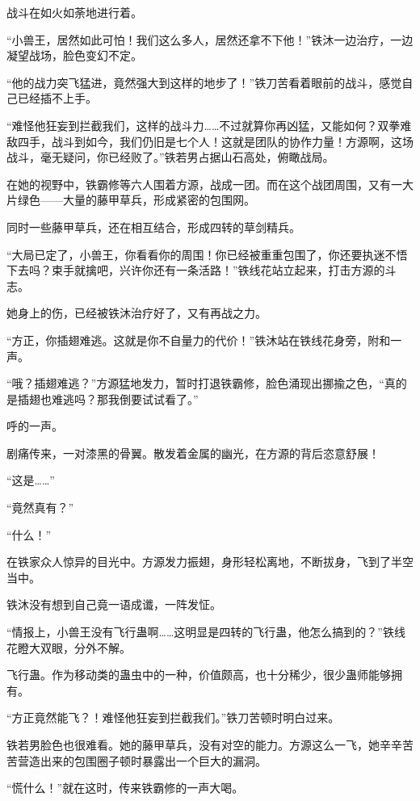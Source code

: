 
\begin{this_body}

战斗在如火如荼地进行着。

“小兽王，居然如此可怕！我们这么多人，居然还拿不下他！”铁沐一边治疗，一边凝望战场，脸色变幻不定。

“他的战力突飞猛进，竟然强大到这样的地步了！”铁刀苦看着眼前的战斗，感觉自己已经插不上手。

“难怪他狂妄到拦截我们，这样的战斗力……不过就算你再凶猛，又能如何？双拳难敌四手，战斗到如今，我们仍旧是七个人！这就是团队的协作力量！方源啊，这场战斗，毫无疑问，你已经败了。”铁若男占据山石高处，俯瞰战局。

在她的视野中，铁霸修等六人围着方源，战成一团。而在这个战团周围，又有一大片绿色——大量的藤甲草兵，形成紧密的包围网。

同时一些藤甲草兵，还在相互结合，形成四转的草剑精兵。

“大局已定了，小兽王，你看看你的周围！你已经被重重包围了，你还要执迷不悟下去吗？束手就擒吧，兴许你还有一条活路！”铁线花站立起来，打击方源的斗志。

她身上的伤，已经被铁沐治疗好了，又有再战之力。

“方正，你插翅难逃。这就是你不自量力的代价！”铁沐站在铁线花身旁，附和一声。

“哦？插翅难逃？”方源猛地发力，暂时打退铁霸修，脸色涌现出挪揄之色，“真的是插翅也难逃吗？那我倒要试试看了。”

呼的一声。

剧痛传来，一对漆黑的骨翼。散发着金属的幽光，在方源的背后恣意舒展！

“这是……”

“竟然真有？”

“什么！”

在铁家众人惊异的目光中。方源发力振翅，身形轻松离地，不断拔身，飞到了半空当中。

铁沐没有想到自己竟一语成谶，一阵发怔。

“情报上，小兽王没有飞行蛊啊……这明显是四转的飞行蛊，他怎么搞到的？”铁线花瞪大双眼，分外不解。

飞行蛊。作为移动类的蛊虫中的一种，价值颇高，也十分稀少，很少蛊师能够拥有。

“方正竟然能飞？！难怪他狂妄到拦截我们。”铁刀苦顿时明白过来。

铁若男脸色也很难看。她的藤甲草兵，没有对空的能力。方源这么一飞，她辛辛苦苦营造出来的包围圈子顿时暴露出一个巨大的漏洞。

“慌什么！”就在这时，传来铁霸修的一声大喝。


\end{this_body}

